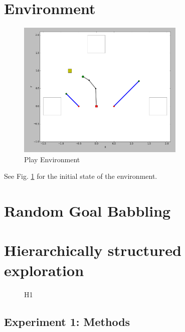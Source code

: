 \documentclass[conference]{include/IEEEtran}
\begin{document}
%


\section{Environment}

	\begin{figure}[!t]
		\centering
		\includegraphics[width=8cm]{./include/tools.png}
		\caption{Play Environment}
		\label{env}
	\end{figure}
	
	See Fig. \ref{env} for the initial state of the environment.

%
	
\section{Random Goal Babbling}


	
%


\section{Hierarchically structured exploration}


	\begin{figure}[!t]
		\center
		
		\caption{H1}
		\label{H1}					
	\end{figure}
	
	
	\subsection{Experiment 1: Methods}		
				
\end{document}
